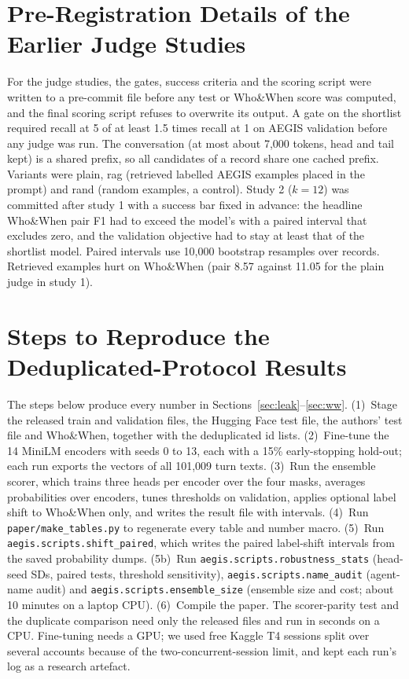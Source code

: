 \documentclass[conference]{IEEEtran}
\begin{document}
\section{Pre-Registration Details of the Earlier Judge Studies}
For the judge studies, the gates, success criteria and the scoring script were written to a pre-commit file before any test or Who\&When score was computed, and the final scoring script refuses to overwrite its output. A gate on the shortlist required recall at 5 of at least 1.5 times recall at 1 on AEGIS validation before any judge was run. The conversation (at most about 7,000 tokens, head and tail kept) is a shared prefix, so all candidates of a record share one cached prefix. Variants were plain, rag (retrieved labelled AEGIS examples placed in the prompt) and rand (random examples, a control). Study 2 ($k=12$) was committed after study 1 with a success bar fixed in advance: the headline Who\&When pair F1 had to exceed the model's with a paired interval that excludes zero, and the validation objective had to stay at least that of the shortlist model. Paired intervals use 10,000 bootstrap resamples over records. Retrieved examples hurt on Who\&When (pair 8.57 against 11.05 for the plain judge in study 1).

\section{Steps to Reproduce the Deduplicated-Protocol Results}
The steps below produce every number in Sections~\ref{sec:leak}--\ref{sec:ww}. (1)~Stage the released train and validation files, the Hugging Face test file, the authors' test file and Who\&When, together with the deduplicated id lists. (2)~Fine-tune the 14 MiniLM encoders with seeds 0 to 13, each with a 15\% early-stopping hold-out; each run exports the vectors of all 101,009 turn texts. (3)~Run the ensemble scorer, which trains three heads per encoder over the four masks, averages probabilities over encoders, tunes thresholds on validation, applies optional label shift to Who\&When only, and writes the result file with intervals. (4)~Run \texttt{paper/make\_tables.py} to regenerate every table and number macro. (5)~Run \texttt{aegis.scripts.shift\_paired}, which writes the paired label-shift intervals from the saved probability dumps. (5b)~Run \texttt{aegis.scripts.robustness\_stats} (head-seed SDs, paired tests, threshold sensitivity), \texttt{aegis.scripts.name\_audit} (agent-name audit) and \texttt{aegis.scripts.ensemble\_size} (ensemble size and cost; about 10 minutes on a laptop CPU). (6)~Compile the paper. The scorer-parity test and the duplicate comparison need only the released files and run in seconds on a CPU. Fine-tuning needs a GPU; we used free Kaggle T4 sessions split over several accounts because of the two-concurrent-session limit, and kept each run's log as a research artefact.
\end{document}
